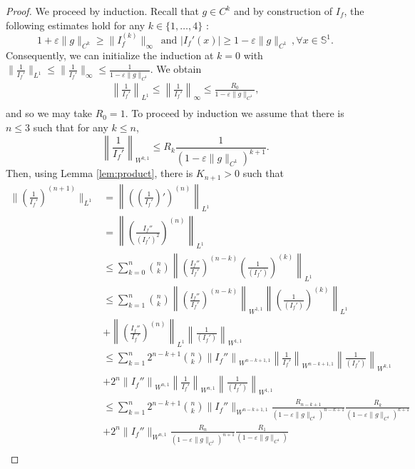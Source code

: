 \documentclass[12pt]{article}
\newcommand{\eps}{\varepsilon}
\theoremstyle{plain}
\begin{document}
{\begin{proof}
We proceed by induction. Recall that $g\in C^k$ and by construction of $I_f$, the following estimates hold for any $k\in \{1,\dots,4\}$ : 
$$
1+\eps\|g\|_{C^k}\geq \|I_f^{(k)}\|_\infty \,\text{ and } |I_f'(x)|\geq 1-\eps \|g\|_{C^1} \,, \forall x\in \mathbb S^1.
$$ 
Consequently, we can initialize the induction at $k=0$ with $\|\frac{1}{I_f'}\|_{L^1}\leq \|\frac{1}{I_f'}\|_{\infty}\leq  \frac{1}{1-\eps \|g\|_{C^1}}$. We obtain 
\begin{align*}
    \left\|\frac{1}{I_f'}\right\|_{L^1}\leq \left\|\frac{1}{I_f'}\right\|_{\infty} \leq \frac{R_0}{1-\eps \|g\|_{C^1}},\\  
\end{align*}
and so we may take $R_0=1$.
To proceed by induction we assume that there is $n\leq 3$ such that for any $k\le n$,  
$$\left\| \frac{1}{I_f'} \right\|_{W^{k,1}}\leq R_k \frac{1}{(1-\eps\|g\|_{C^1})^{k+1}}.$$ 
Then, using Lemma \ref{lem:product}, there is $K_{n+1}>0$ such that
\begin{align*}
    \|\left(\frac{1}{I_f'}\right)^{(n+1)}\|_{L^1}&= \left\|\left(\left(\frac{1}{I_f'}\right)'\right)^{(n)}\right\|_{L^1}\\
    &= \left\|\left(\frac{I_f''}{(I_f')^2}\right)^{(n)}\right\|_{L^1}\\
    &\leq \sum_{k=0}^{n} {n \choose k}\left\|\left(\frac{I_f''}{I_f'}\right)^{(n-k)}\left(\frac{1}{(I_f')}\right)^{(k)} \right\|_{L^1}\\
        &\leq \sum_{k=1}^{n}{n \choose k}\left\|\left(\frac{I_f''}{I_f'}\right)^{(n-k)}\right\|_{W^{1,1}}\left\|\left(\frac{1}{(I_f')}\right)^{(k)} \right\|_{L^1}\\
   & +\left\|\left(\frac{I_f''}{I_f'}\right)^{(n)}\right\|_{L^1}\left\|\frac{1}{(I_f')} \right\|_{W^{1,1}}\\
   &\leq \sum_{k=1}^{n}2^{n-k+1}{n \choose k}\left\|I_f''\right\|_{W^{n-k+1,1}}\left\|\frac{1}{I_f'}\right\|_{W^{n-k+1,1}}\left\|\frac{1}{(I_f')} \right\|_{W^{k,1}}\\
   & +2^n\left\|I_f''\right\|_{W^{n,1}}\left\|\frac{1}{I_f'}\right\|_{W^{n,1}}\left\|\frac{1}{(I_f')} \right\|_{W^{1,1}}\\
    &\leq \sum_{k=1}^{n}2^{n-k+1}{n \choose k}\|I_f''\|_{W^{n-k+1,1}}\frac{R_{n-k+1}}{(1-\eps \|g\|_{C^1})^{n-k+1}}\frac{R_{k}}{(1-\eps \|g\|_{C^1})^{k+1}}\\
     & +2^n\|I_f''\|_{W^{n,1}}\frac{R_{n}}{(1-\eps \|g\|_{C^1})^{n+1}}\frac{R_{1}}{(1-\eps \|g\|_{C^1})}\\

\end{align*}
\end{proof}}
\end{document}
